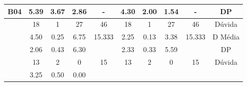 \begin{table}[htbp]
\begin{tabular}{|cccccccccc}
		\multicolumn{1}{|c|}{\multirow{-3}{*}{\cellcolor[HTML]{F2F2F2}\textbf{B04}}} &
		\multicolumn{1}{c|}{5.39} &
		\multicolumn{1}{c|}{3.67} &
		\multicolumn{1}{c|}{2.86} &
		\multicolumn{1}{c|}{-} &
		\multicolumn{1}{c|}{4.30} &
		\multicolumn{1}{c|}{2.00} &
		\multicolumn{1}{c|}{1.54} &
		\multicolumn{1}{c|}{-} &
		\multicolumn{1}{c|}{DP} \\ \hline
		\rowcolor[HTML]{D9D9D9} 
		\multicolumn{1}{|c|}{\cellcolor[HTML]{F2F2F2}} &
		\multicolumn{1}{c|}{\cellcolor[HTML]{D9D9D9}18} &
		\multicolumn{1}{c|}{\cellcolor[HTML]{D9D9D9}1} &
		\multicolumn{1}{c|}{\cellcolor[HTML]{D9D9D9}27} &
		\multicolumn{1}{c|}{\cellcolor[HTML]{D9D9D9}46} &
		\multicolumn{1}{c|}{\cellcolor[HTML]{D9D9D9}18} &
		\multicolumn{1}{c|}{\cellcolor[HTML]{D9D9D9}1} &
		\multicolumn{1}{c|}{\cellcolor[HTML]{D9D9D9}27} &
		\multicolumn{1}{c|}{\cellcolor[HTML]{D9D9D9}46} &
		\multicolumn{1}{c|}{\cellcolor[HTML]{D9D9D9}Dúvida} \\ \cline{2-10} 
		\multicolumn{1}{|c|}{\cellcolor[HTML]{F2F2F2}} &
		\multicolumn{1}{c|}{4.50} &
		\multicolumn{1}{c|}{0.25} &
		\multicolumn{1}{c|}{6.75} &
		\multicolumn{1}{c|}{15.333} &
		\multicolumn{1}{c|}{2.25} &
		\multicolumn{1}{c|}{0.13} &
		\multicolumn{1}{c|}{3.38} &
		\multicolumn{1}{c|}{15.333} &
		\multicolumn{1}{c|}{D Média} \\ \cline{2-10} 
		\rowcolor[HTML]{D9D9D9} 
		\multicolumn{1}{|c|}{\multirow{-3}{*}{\cellcolor[HTML]{F2F2F2}\textbf{B05}}} &
		\multicolumn{1}{c|}{\cellcolor[HTML]{D9D9D9}2.06} &
		\multicolumn{1}{c|}{\cellcolor[HTML]{D9D9D9}0.43} &
		\multicolumn{1}{c|}{\cellcolor[HTML]{D9D9D9}6.30} &
		\multicolumn{1}{c|}{\cellcolor[HTML]{D9D9D9}} &
		\multicolumn{1}{c|}{\cellcolor[HTML]{D9D9D9}2.33} &
		\multicolumn{1}{c|}{\cellcolor[HTML]{D9D9D9}0.33} &
		\multicolumn{1}{c|}{\cellcolor[HTML]{D9D9D9}5.59} &
		\multicolumn{1}{c|}{\cellcolor[HTML]{D9D9D9}} &
		\multicolumn{1}{c|}{\cellcolor[HTML]{D9D9D9}DP} \\ \hline
		\multicolumn{1}{|c|}{\cellcolor[HTML]{F2F2F2}} &
		\multicolumn{1}{c|}{13} &
		\multicolumn{1}{c|}{2} &
		\multicolumn{1}{c|}{0} &
		\multicolumn{1}{c|}{15} &
		\multicolumn{1}{c|}{13} &
		\multicolumn{1}{c|}{2} &
		\multicolumn{1}{c|}{0} &
		\multicolumn{1}{c|}{15} &
		\multicolumn{1}{c|}{Dúvida} \\ \cline{2-10} 
		\rowcolor[HTML]{D9D9D9} 
		\multicolumn{1}{|c|}{\cellcolor[HTML]{F2F2F2}} &
		\multicolumn{1}{c|}{\cellcolor[HTML]{D9D9D9}3.25} &
		\multicolumn{1}{c|}{\cellcolor[HTML]{D9D9D9}0.50} &
		\multicolumn{1}{c|}{\cellcolor[HTML]{D9D9D9}0.00} &

\end{tabular}
\end{table}
